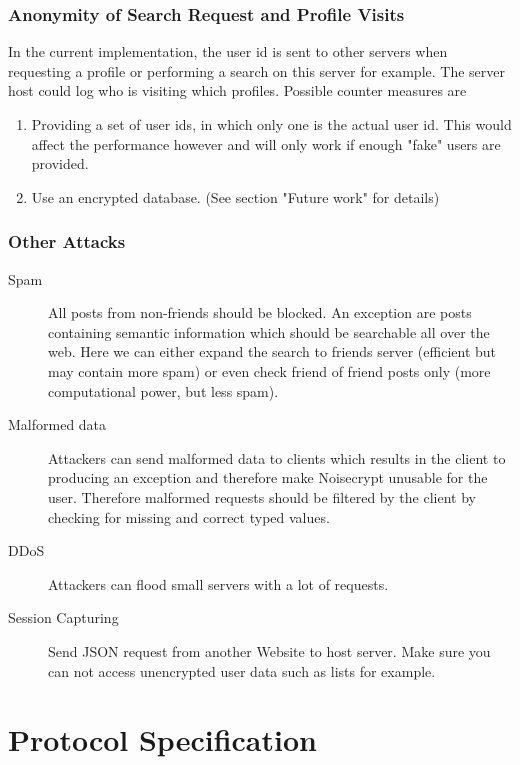 \documentclass{scrartcl}
\begin{document}
\subsubsection{Anonymity of Search Request and Profile Visits}
      In the current implementation, the user id is sent to other servers when requesting a profile or performing a search on this server for example. The server host could log who is visiting which profiles. 
Possible counter measures are 
\begin{enumerate}
\item Providing a set of user ids, in which only one is the actual user id. This would affect the performance however and will only work if enough "fake" users are provided.
\item Use an encrypted database. (See section "Future work" for details)
\end{enumerate}      
      
      \subsubsection{Other Attacks}
      
      \begin{description}
      
     
      
\item[Spam]      All posts from non-friends should be blocked. An exception are posts containing semantic information which should be searchable all over the web. Here we can either expand the search to friends server (efficient but may contain more spam) or even check friend of friend posts only (more computational power, but less spam).
\item[Malformed data]      Attackers can send malformed data to clients which results in the client to producing an exception and therefore make Noisecrypt unusable for the user. Therefore malformed requests should be filtered by the client by checking for missing and correct typed values.
\item[DDoS]
Attackers can flood small servers with a lot of requests.
\item[Session Capturing] Send JSON request from another Website to host server. Make sure you can not access unencrypted user data such as lists for example.
\end{description}


\clearpage
\section{Protocol Specification \label{protocol}}
\end{document}
